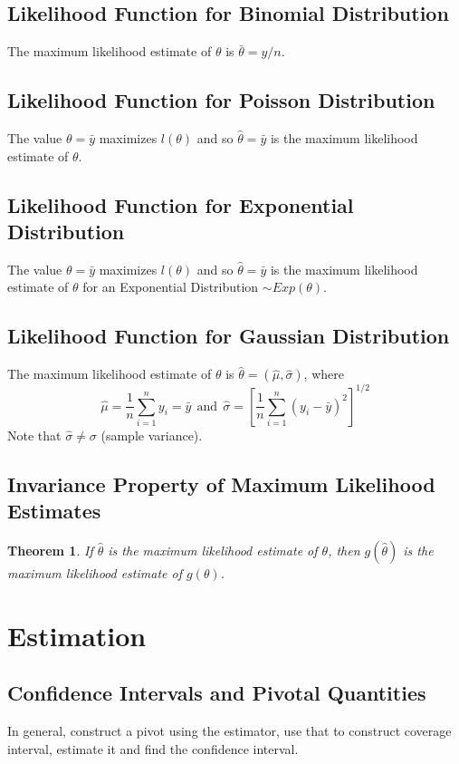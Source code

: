 \documentclass[12pt, leqno]{article}
\theoremstyle{definition}
\newtheorem*{theorem}{Theorem}
\begin{document}
  \subsection{Likelihood Function for Binomial Distribution}
  The maximum likelihood estimate of $\theta$ is $\bar{\theta} = y / n$.

  \subsection{Likelihood Function for Poisson Distribution}
  The value $\theta = \bar{y}$ maximizes $l(\theta)$ and so $\hat{\theta} = \bar{y}$ is the maximum likelihood estimate of $\theta$.

  \subsection{Likelihood Function for Exponential Distribution}
  The value $\theta = \bar{y}$ maximizes $l(\theta)$ and so $\hat{\theta} = \bar{y}$ is the maximum likelihood estimate of $\theta$ for an Exponential Distribution $\sim Exp(\theta)$.

  \subsection{Likelihood Function for Gaussian Distribution}
  The maximum likelihood estimate of $\theta$ is $\hat{\theta} = (\hat{\mu}, \hat{\sigma})$, where
  $$
  \hat{\mu} = \frac{1}{n}\sum_{i=1}^{n}y_{i} = \bar{y}
  ~~\text{and}~~
  \hat{\sigma} = \left[\frac{1}{n}\sum_{i=1}^{n}(y_{i} - \bar{y})^{2}\right]^{1/2}
  $$
  Note that $\hat{\sigma} \not = \sigma$ (sample variance).

  \subsection{Invariance Property of Maximum Likelihood Estimates}
  \begin{theorem}
    \emph{If $\hat{\theta}$ is the maximum likelihood estimate of $\theta$, then $g(\hat{\theta})$ is the maximum likelihood estimate of $g(\theta)$.}
  \end{theorem}
  \newpage
  \section{Estimation}
  \subsection{Confidence Intervals and Pivotal Quantities}
  In general, construct a pivot using the estimator, use that to construct coverage interval, estimate it and find the confidence interval.
\end{document}
